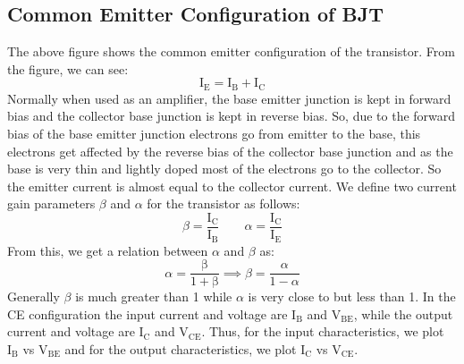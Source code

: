 \subsection{Common Emitter Configuration of BJT}

The above figure shows the common emitter configuration of the transistor. From the figure, we can see: 
$$\mathrm{I_E = I_B+ I_C}$$
Normally when used as an amplifier,
the base emitter junction is kept in forward bias and the collector base junction is kept
in reverse bias. So, due to the forward bias of the base emitter junction electrons go
from emitter to the base, this electrons get affected by the reverse bias of the collector
base junction and as the base is very thin and lightly doped most of the electrons go
to the collector. So the emitter current is almost equal to the collector current. We define two current gain parameters $\beta$ and $\alpha$ for the transistor as follows:
$$\beta = \mathrm{\frac{I_C}{I_B}}\qquad \alpha = \mathrm{\frac{I_C}{I_E}}$$
From this, we get a relation between $\alpha$ and $\beta$ as:
$$\alpha = \mathrm{\frac{\beta}{1+\beta}} \implies \beta = \frac{\alpha}{1-\alpha} $$
Generally $\beta$ is much greater than 1 while $\alpha$ is very close to but less than 1. In the CE configuration the input current and voltage are $\mathrm{I_B}$ and $\mathrm{V_{BE}}$, while the output current and voltage are $\mathrm{I_C}$ and $\mathrm{V_{CE}}$. Thus, for the input characteristics, we plot $\mathrm{I_B}$ vs $\mathrm{V_{BE}}$ and for the output characteristics, we plot $\mathrm{I_C}$ vs $\mathrm{V_{CE}}$.
